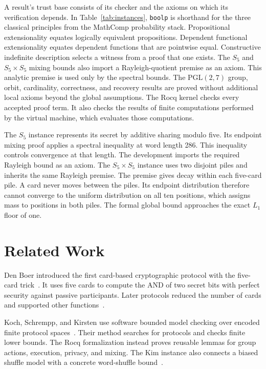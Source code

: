 \documentclass[runningheads]{llncs}
\newcommand{\Rocq}{Rocq}
\newcommand{\coqin}[1]{\texttt{#1}}
\newcommand{\PG}{\mathrm{PGL}(2,7)}
\begin{document}
A result's trust base consists of its checker and the axioms on which its
verification depends. In Table~\ref{tab:instances}, \coqin{boolp} is shorthand
for the three classical principles from the MathComp probability stack.
Propositional
extensionality equates logically equivalent propositions. Dependent functional
extensionality equates dependent functions that are pointwise equal.
Constructive indefinite description selects a witness from a proof that one
exists. The $S_5$ and $S_5\times S_5$ mixing bounds also import a
Rayleigh-quotient premise as an axiom. This analytic premise is used only by
the spectral bounds. The $\PG$ group, orbit, cardinality, correctness, and
recovery results are proved without additional local axioms beyond the global
assumptions. The \Rocq{} kernel checks every accepted proof term. It also
checks the results of finite computations performed by the virtual machine,
which evaluates those computations.

The $S_5$ instance represents its secret by additive sharing modulo five. Its
endpoint mixing proof applies a spectral inequality at word length 286. This
inequality controls convergence at that length. The development imports the
required Rayleigh bound as an axiom. The $S_5\times S_5$ instance uses two
disjoint piles and inherits the same Rayleigh premise. The premise gives decay
within each five-card pile. A card never moves between the piles. Its endpoint
distribution therefore cannot converge to the uniform distribution on all ten
positions, which assigns mass to positions in both piles. The formal global
bound approaches the exact $L_1$ floor of one.

\section{Related Work}\label{sec:related}

Den Boer introduced the first card-based cryptographic protocol with the
five-card trick~\cite{denBoer1989,KochFUN2021}. It uses five cards to compute
the AND of two secret bits with perfect security against passive participants.
Later protocols reduced the number of cards and supported other
functions~\cite{MizukiSone2009,MizukiSone2012,KochWalzerHartel2015}.

Koch, Schrempp, and Kirsten use software bounded model checking over encoded
finite protocol spaces~\cite{Koch2019}. Their method searches for protocols
and checks finite lower bounds. The \Rocq{} formalization instead proves
reusable lemmas for group actions, execution, privacy, and mixing. The Kim
instance also connects a biased shuffle model with a concrete word-shuffle
bound~\cite{KimCetinkaya2025}.
\end{document}
